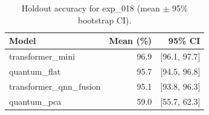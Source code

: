 \begin{table}[ht]
\centering
\caption{Holdout accuracy for exp_018 (mean $\pm$ 95\% bootstrap CI).}
\label{tab:exp_018}
\begin{tabular}{lrr}
\toprule
Model & Mean (\%) & 95\% CI \\
\midrule
transformer\_mini & 96.9 & [96.1, 97.7] \\
quantum\_flat & 95.7 & [94.5, 96.8] \\
transformer\_qnn\_fusion & 95.1 & [93.8, 96.3] \\
quantum\_pca & 59.0 & [55.7, 62.3] \\
\bottomrule
\end{tabular}
\end{table}
